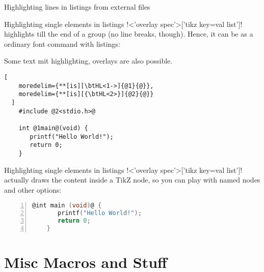 \documentclass{beamer}
\begin{document}
\begin{frame}[fragile]{Highlighting lines in listings from external files}
\begin{LTXexample}[pos=r]
\end{LTXexample}

\end{frame}

\begin{frame}[fragile]{Highlighting single elements in listings}
\scriptsize !\btHL<'overlay spec'>['tikz key=val list']! highlights till the end of a group (no line breaks, though).  Hence, it can be as a ordinary font command with listings:
\begin{LTXexample}[pos=b]
\bii
  \ii Some {text mit \btHL highlighting}, overlays are {also} possible.
\eii
\lstset{language=C, autogobble}
\begin{lstlisting}[
    moredelim={**[is][\btHL<1->]{@1}{@}},
    moredelim={**[is][{\btHL<2>}]{@2}{@}}
  ]
    #include @2<stdio.h>@

    int @1main@(void) {
       printf("Hello World!");  
       return 0;
    }
\end{lstlisting}
\end{LTXexample}
\end{frame}

\begin{frame}[fragile]{Highlighting single elements in listings}
\bii
\ii !\btHL<'overlay spec'>['tikz key=val list']! actually draws the content inside a TikZ node, so you can play with named nodes and other options:
\eii
\begin{LTXexample}[pos=b]
\begin{lstlisting}[language=C, autogobble, numbers=left,
    moredelim={**[is][{%
      \btHL[name=X, remember picture, onslide=<2->{fill=red!50}]%
    }]{@}{@}},
  ]
    @int main (void)@ {
       printf("Hello World!");  
       return 0;
    }
\end{lstlisting}
\end{LTXexample}
\end{frame}

\section{Misc Macros and Stuff}
\end{document}

